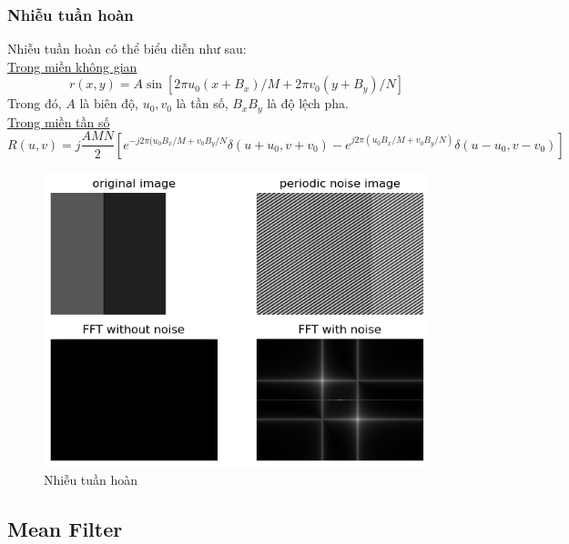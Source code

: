\documentclass{article}
\begin{document}
    \subsubsection*{Nhiễu tuần hoàn}
    Nhiễu tuần hoàn có thể biểu diễn như sau:\\
    \underline{Trong miền không gian}
    $$r(x,y) = A \sin \left[2\pi u_0 (x+B_x)/M + 2\pi v_0 (y+ B_y) /N \right]$$
    Trong đó, $A$ là biên độ, $u_0, v_0$ là tần số, $B_x B_y$ là độ lệch pha.\\
    \underline{Trong miền tần số}
    $$R(u,v) = j\frac{AMN}{2} \left[ e^{-j2\pi(u_0B_x/M+v_0B_y/N}\delta(u+u_0,v+v_0)-e^{j2\pi(u_0B_x/M+v_0B_y/N)}\delta(u-u_0,v-v_0) \right]$$
    \begin{figure}[ht!]
        \centering
        \includegraphics[width = \linewidth]{n3.png}
        \caption{Nhiễu tuần hoàn}
        \label{fig3}
    \end{figure}
    \subsection{Mean Filter}
\end{document}
